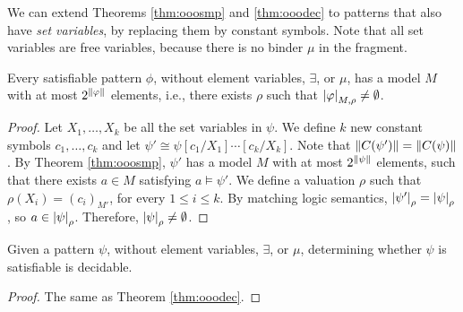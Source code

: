 We can extend Theorems \ref{thm:ooosmp} and \ref{thm:ooodec}
to patterns that also have \emph{set variables},
by replacing them by constant symbols.
Note that all set variables are free variables, because there is no binder
\(\mu\) in the fragment.

\begin{theorem}\label{thm:ooosmp_sv}
Every satisfiable pattern $\phi$, without element variables, $\exists$, or 
$\mu$,
has a model $M$ with at most ${2^{\left\lVert \varphi\right\rVert}}$ elements,
i.e., there exists $\rho$ such that $\left| {\varphi} \right|_{M,\rho} \neq \emptyset$.
\end{theorem}
\begin{proof}
Let $X_1,\dots,X_k$ be all the set variables in $\psi$.
We define $k$ new constant symbols $c_1,\dots,c_k$
and let $\psi' \cong \psi[c_1/X_1]\cdots[c_k/X_k]$.
Note that $\left\lVert C(\psi')\right\rVert = \left\lVert C(\psi)\right\rVert$.
By Theorem \ref{thm:ooosmp}, $\psi'$ has a model $M$ with at most 
${2^{\left\lVert \psi\right\rVert}}$ elements, such that there exists $a \in M$
satisfying $a \vDash \psi'$.
We define a valuation $\rho$ such that $\rho(X_i) = (c_i)_{M'}$, for
every $1 \le i \le k$.
By matching logic semantics, $\left| {\psi'} \right|_{\rho} = \left| {\psi} \right|_{\rho}$,
so $a \in \left| {\psi} \right|_{\rho}$.
Therefore, $\left| {\psi} \right|_{\rho} \neq \emptyset$.
\end{proof}

\begin{theorem}\label{thm:ooodec_sv}
Given a pattern $\psi$, without element variables, $\exists$, or 
$\mu$,
determining whether $\psi$ is satisfiable is decidable.
\end{theorem}
\begin{proof}
The same as Theorem \ref{thm:ooodec}.
\end{proof}
